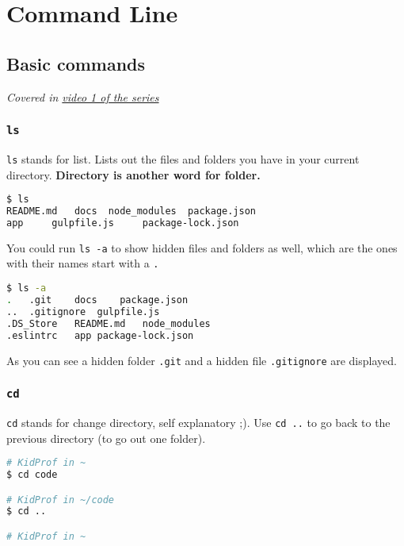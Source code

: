 \chapter{Command Line}

\section{Basic commands}

\textit{Covered in \href{https://www.youtube.com/watch?v=oIsH0V3fRt8&list=PLjGmdnqrOKuYXiu7lgG5HW71jPEUd1XCm&index=2}{video 1 of the series}}

\subsection{\texttt{ls}}

\texttt{ls} stands for list. Lists out the files and folders you have in your current directory. \textbf{Directory is another word for folder.}

\begin{lstlisting}[language=bash]
$ ls
README.md   docs  node_modules  package.json    
app     gulpfile.js     package-lock.json
\end{lstlisting}

You could run \texttt{ls -a} to show hidden files and folders as well, which are the ones with their names start with a \texttt{.}

\begin{lstlisting}[language=bash]
$ ls -a
.   .git    docs    package.json
..  .gitignore  gulpfile.js
.DS_Store   README.md   node_modules
.eslintrc   app package-lock.json
\end{lstlisting}

As you can see a hidden folder \texttt{.git} and a hidden file \texttt{.gitignore} are displayed.

\subsection{\texttt{cd}}

\texttt{cd} stands for change directory, self explanatory ;). Use \texttt{cd ..} to go back to the previous directory (to go out one folder). 

\begin{lstlisting}[language=bash]
# KidProf in ~
$ cd code

# KidProf in ~/code
$ cd ..

# KidProf in ~
\end{lstlisting}

